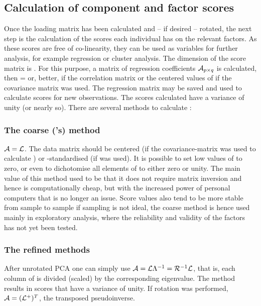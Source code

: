 \begin{refsection}
\subsection{Calculation of component and factor scores}

Once the loading matrix  has been calculated and -- if desired -- rotated, the next step is the calculation of the scores each individual has on the  relevant factors. As these scores are free of co-linearity, they can be used as variables for further analysis, for example regression or cluster analysis. The dimension of the score matrix  is . For this purpose, a matrix of regression coefficients $\mathcal{A}_{p\times q}$ is calculated, then   =  or, better,  if the correlation matrix or the centered values of  if the covariance matrix was used. The regression matrix may be saved and used to calculate scores for new observations. The scores calculated have a variance of unity (or nearly so). There are several methods to calculate  \parencite{ttn-14}:

\subsubsection{The coarse ('s) method}

\( \mathcal{A} = \mathcal{L}\). The data matrix  should be centered (if the covariance-matrix  was used to calculate ) or -standardised (if  was used). It is possible to set low values of  to zero, or even to dichotomise all elements of  to either zero or unity. The main value of this method used to be that it does not require matrix inversion and hence is computationally cheap, but with the increased power of personal computers that is no longer an issue. Score values also tend to be more stable from sample to sample if sampling is not ideal, the coarse method is hence used mainly in exploratory analysis, where the reliability and validity of the factors has not yet been tested.

\subsubsection{The refined methods}

After unrotated PCA one can simply use \( \mathcal{A} = \mathcal{L} \Lambda^{-1} = \mathcal{R}^{-1} \mathcal{L} \), that is, each column of  is divided (scaled) by the corresponding eigenvalue. The method results in scores that have a variance of unity. If rotation was performed, \( \mathcal{A} = (\mathcal{L}^+)^T \), the transposed pseudoinverse.


\end{refsection}

